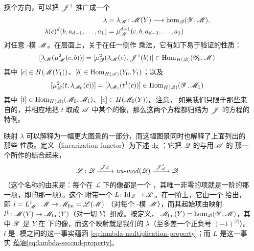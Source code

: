 换个方向，可以把 $\mathscr{J}^1$ 推广成一个\trChainMap
\begin{equation}\label{eq:yoneda-evaluation-chain-map}
\begin{split}
\lambda&=\lambda_{\mathscr{M}}\colon\mathscr{M}(Y)
\longrightarrow\hom_{\mathscr{Q}}(\mathscr{Y},\mathscr{M}),\\
\lambda(c)^d(b,a_{d-1},\ldots,a_1)&=\mu^{d+1}_{\mathscr{M}}(c,b,a_{d-1},\ldots,a_1)
\end{split}
\end{equation}
对任意\trNonunital{} \trAinfty-模 $\mathscr{M}$。在\trCohomology{}层面上，关于在任一侧作
乘法，它有如下易于验证的性质：
\begin{equation}\label{eq:lambda-multiplication-property}
[\lambda_{\mathscr{M}}(\mu^2_{\mathscr{M}}(c,b))]
=[\mu^2_{\mathscr{Q}}(\lambda_{\mathscr{M}}(c),\mathscr{J}^1(b))]
\in\operatorname{Hom}_{H(\mathscr{Q})}(\mathscr{Y}_0,\mathscr{M})
\end{equation}
其中 $[c]\in H(\mathscr{M}(Y_1))$、$[b]\in\operatorname{Hom}_{H(\mathscr{A})}(Y_0,Y_1)$；以及
\begin{equation}\label{eq:lambda-second-property}
[\mu^2_{\mathscr{Q}}(t,\lambda_{\mathscr{M}_0}(c))]
=[\lambda_{\mathscr{M}_1}(t^1(c))]
\in\operatorname{Hom}_{H(\mathscr{Q})}(\mathscr{Y},\mathscr{M}_1)
\end{equation}
其中 $[t]\in\operatorname{Hom}_{H(\mathscr{Q})}(\mathscr{M}_0,\mathscr{M}_1)$、$[c]\in H(\mathscr{M}_0(Y))$。注意，
如果我们只限于那些来自\trYonedaEmbedding{}的\trModule，并相应地把 $t$ 取成 $\mathscr{A}$
中某个\trMorphism{}的像，那么这两个方程都归结为 $\mathscr{J}$ 的\trAFunctor{}方程的特例。

\begin{remark}\label{thm:linearization-functor-picture}
映射 $\lambda$ 可以解释为一幅更大图景的一部分，而这幅图景同时也解释了上面列出的那些
性质。定义\textbf{\trLinearization\trFunctor}（linearization functor）为下述%
\trNonunital{} dg \trFunctor：它把 $\mathscr{Q}$ 的\trYonedaEmbedding{}与用 $\mathscr{A}$ 的
那一个所作的\trPullback{}结合起来，
\begin{equation*}
\mathscr{L}\colon\mathscr{Q}\xrightarrow{\;\mathscr{J}_{\mathscr{Q}}\;}
\mathit{nu}\text{-}\mathit{mod}(\mathscr{Q})\xrightarrow{\;\mathscr{J}^*_{\mathscr{A}}\;}\mathscr{Q}
\end{equation*}
（这个名称的由来是：每个\trModule\trHomomorphism{}在 $\mathscr{L}$ 下的像都是一个%
\trHomomorphism，其唯一非零的项就是一阶的那一项，即\trLinear{}的那一项）。这个%
\trFunctor{}附带一个\trCanonical{}\trNaturalTransformation{}%
$L\colon\mathrm{Id}_{\mathscr{Q}}\to\mathscr{L}$。在一阶上，它由一个\trModule\trHomomorphism%
{}给出，即 $l=L^1_{\mathscr{M}}\colon\mathscr{M}\to\mathscr{M}_{\mathrm{lin}}=\mathscr{L}(\mathscr{M})$
（对每个 \trAinfty-模 $\mathscr{M}$），而其起始项由\trLinear{}映射
$l^1\colon\mathscr{M}(Y)\to\mathscr{M}_{\mathrm{lin}}(Y)$（对一切 $Y$）组成。按定义，
$\mathscr{M}_{\mathrm{lin}}(Y)=\hom_{\mathscr{Q}}(\mathscr{Y},\mathscr{M})$，其中 $\mathscr{Y}$ 是 $Y$ 在%
\trYonedaEmbedding{}下的像，而这个\trLinear{}映射就是我们的 $\lambda$（至多差一个正负号
$(-1)^{|c|}$）。$l$ 是 \trAinfty-模之间的\trHomomorphism{}这一事实蕴涵
\eqref{eq:lambda-multiplication-property}；而 $L$ 是\trNaturalTransformation{}这一事实
蕴涵\eqref{eq:lambda-second-property}。
\end{remark}
